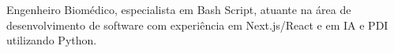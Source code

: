 Engenheiro Biomédico,  especialista em Bash Script, atuante na área de desenvolvimento de software com experiência em Next.js/React e em IA e PDI utilizando Python.
